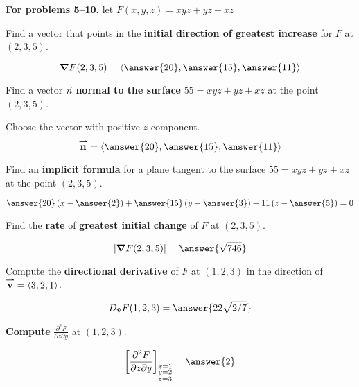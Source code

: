 \documentclass{ximera}
\author{Darry Andrews and Bart Snapp}
\begin{document}
\textbf{For problems 5--10,} let $F(x,y,z) = xyz+yz + xz$

\begin{problem}
  Find a vector that points in the \textbf{initial direction of
    greatest increase} for $F$ at $(2,3,5)$.
  \begin{prompt}
  \[
  \grad F (2,3,5)= \vector{\answer{20},\answer{15},\answer{11}}
  \]
  \end{prompt}

  \vfill
  
\end{problem}

\begin{problem}
  Find a vector $\vec{n}$ \textbf{normal to the surface} $55 = xyz+yz + xz$ at
  the point $(2,3,5)$.
  \begin{prompt}
    Choose the vector with positive $z$-component.
  \[
  \vec{n} = \vector{\answer{20},\answer{15},\answer{11}}
  \]
  \end{prompt}

  \vfill
  
\end{problem}



\begin{problem}
  Find an \textbf{implicit formula} for a plane tangent to the surface
  $55 = xyz+yz + xz$ at the point $(2,3,5)$.
  \begin{prompt}
    \[
    \answer{20}\left(x-\answer{2}\right) + \answer{15}\left(y-\answer{3}\right) + 11 \left(z-\answer{5}\right) = 0
    \]
  \end{prompt}
  
  \vfill
\end{problem}



\begin{problem}
  Find the \textbf{rate} of \textbf{greatest initial change} of $F$ at
  $(2,3,5)$.
  \begin{prompt}
  \[
  |\grad F(2,3,5)| = \answer{\sqrt{746}}
  \]
  \end{prompt}

  \vfill
\end{problem}

\begin{problem}
  Compute the \textbf{directional derivative} of $F$ at $(1,2,3)$ in the direction of ${\overset{\boldsymbol{\rightharpoonup}}{\mathbf{v}}} = \left\langle 3,2,1\right\rangle$.
  \begin{prompt}
    \[
    D_{\uvec{v}} F(1,2,3) = \answer{22 \sqrt{2/7}}
    \]
  \end{prompt}

  \vfill
\end{problem}

\begin{problem}
  \textbf{Compute} $\frac{\partial^2 F}{\partial z \partial y}$ at $(1,2,3)$.
  \begin{prompt}
    \[
    \eval{\frac{\partial^2 F}{\partial z \partial y}}_{\substack{x=1\\ y=2\\ z=3}} = \answer{2}
    \]
  \end{prompt}

  \vfill
\end{problem}
\end{document}
